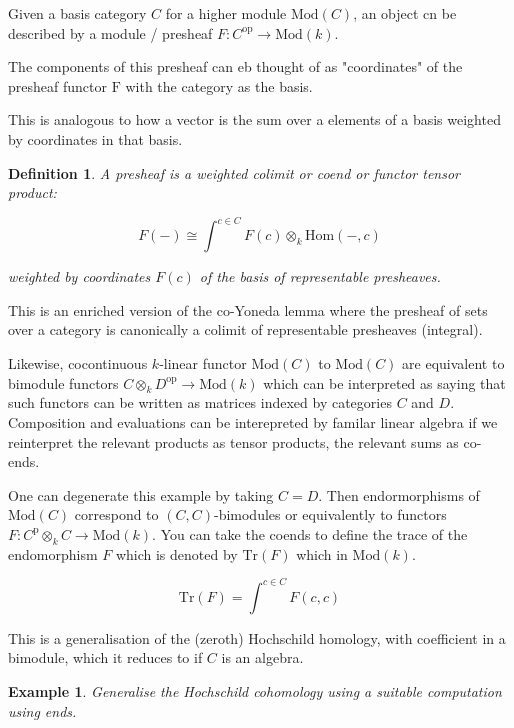 \documentclass{tufte-book}
\newtheorem{definition}[theorem]{Definition}
\newtheorem{example}[theorem]{Example}
\begin{document}
Given a basis category $C$ for a higher module $\mathrm{Mod}(C)$, an object cn be described by a module / presheaf $F : C^\mathrm{op} \rightarrow \mathrm{Mod}(k)$.

The components of this presheaf can eb thought of as "coordinates" of the presheaf functor $\mathrm{F}$ with the category as the basis.

This is analogous to how a vector is the sum over a elements of a basis weighted by coordinates in that basis.

\begin{definition}
	A presheaf is a weighted colimit or coend or functor tensor product:

	\begin{equation}
		F(-) \cong \int^{c \in C}
		F(c) \otimes_k \mathrm{Hom}(-,c)
	\end{equation}

	weighted by coordinates $F(c)$ of the basis of representable presheaves.
\end{definition}

This is an enriched version of the co-Yoneda lemma where the presheaf of sets over a category is canonically a colimit of representable presheaves (integral).

Likewise, cocontinuous $k$-linear functor $\mathrm{Mod}(C)$ to $\mathrm{Mod}(C)$ are equivalent to bimodule functors $C \otimes_k D^\mathrm{op} \rightarrow \mathrm{Mod}(k)$ which can be interpreted as saying that such functors can be written as matrices indexed by categories $C$ and $D$. Composition and evaluations can be interepreted by familar linear algebra if we reinterpret the relevant products as tensor products, the relevant sums as co-ends.

One can degenerate this example by taking $C = D$. Then endormorphisms of $\mathrm{Mod}(C)$ correspond to $(C,C)$-bimodules or equivalently to functors $F : C^\mathrm{p} \otimes_k C \rightarrow \mathrm{Mod}(k)$. You can take the coends to define the trace of the endomorphism $F$ which is denoted by $\mathrm{Tr}(F)$ which in $\mathrm{Mod}(k)$.

\begin{equation}
	\mathrm{Tr}(F) = \int^{c \in C}
	F(c,c)
\end{equation}

This is a generalisation of the (zeroth) Hochschild homology, with coefficient in a bimodule, which it reduces to if $C$ is an algebra.

\begin{example}
	Generalise the Hochschild cohomology using a suitable computation using ends.
\end{example}
\end{document}

